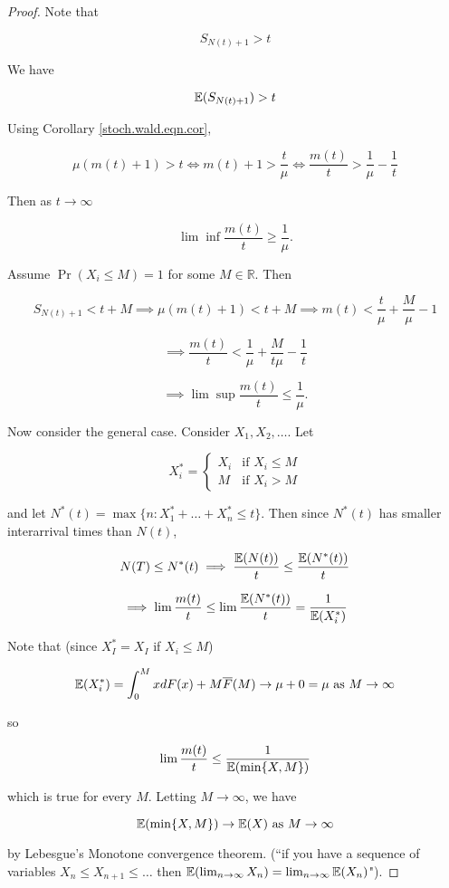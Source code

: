 \begin{proof}

Note that

\[
S_{N(t) + 1} > t
\]

We have

\[
\E(S_{N(t) + 1}) > t
\]

Using Corollary \ref{stoch.wald.eqn.cor},

\[
\mu(m(t) + 1) > t \iff m(t) + 1 > \frac{t}{\mu} \iff \frac{m(t)}{t} > \frac{1}{\mu} - \frac{1}{t} 
\]

Then as \(t \to \infty\)

\[
\lim \inf \frac{m(t)}{t} \geq \frac{1}{\mu}.
\]

Assume \(\Pr(X_i \leq M) = 1\) for some \(M \in \mathbb{R}\). Then

\[
S_{N(t) + 1} < t + M \implies \mu(m(t)+ 1) < t + M \implies m(t) < \frac{t}{\mu} + \frac{M}{\mu} - 1
\]

\[
\implies \frac{m(t)}{t} < \frac{1}{\mu} + \frac{M}{t\mu} - \frac{1}{t} 
\]

\[
\implies \lim \sup \frac{m(t)}{t} \leq \frac{1}{\mu}.
\]

Now consider the general case. Consider \(X_1, X_2, \ldots\). Let

\[
X_i^* = \begin{cases}
X_i & \text{if } X_i \leq M \\
M & \text{if } X_i > M
\end{cases}
\]


and let \(N^*(t) = \max \{n: X_1^* + \ldots + X_n^* \leq t\}\). Then since \(N^*(t)\) has smaller interarrival times than \(N(t)\),

\[
N(T) \leq N^*(t) \implies \frac{\E(N(t))}{t} \leq \frac{\E(N^*(t)) }{t}
\]

\[
\implies \lim \frac{m(t)}{t} \leq \lim \frac{\E(N^*(t))}{t} = \frac{1}{\E(X_i^*)}
\]

Note that (since \(X_I^* = X_I\) if \(X_i \leq M\))

\[
\E(X_i^*) = \int_0^M x dF(x) + M \overline{F}(M) \to \mu + 0 = \mu \text{ as } M \to \infty
\]

so

\[
 \lim \frac{m(t)}{t} \leq \frac{1}{\E(\min\{X, M \})}
\]

which is true for every \(M\). Letting \(M \to \infty\), we have

\[
\E(\min\{X, M \}) \to \E(X) \text{ as } M \to \infty
\]

by Lebesgue's Monotone convergence theorem. (``if you have a sequence of variables \(X_n \leq X_{n+1} \leq \ldots\) then \(\E(\lim_{n \to \infty} X_n) = \lim_{n \to \infty} \E(X_n)\)"). 


\end{proof}

